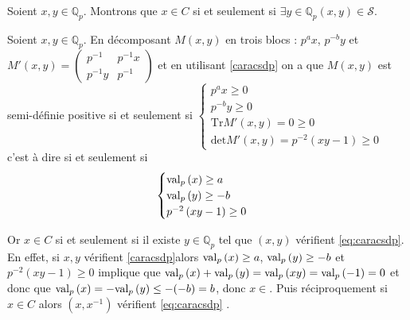 Soient $x,y \in \mathbb{Q}_{p} $. Montrons que $x \in C$ si et seulement si  $\exists y \in \mathbb{Q}_{p} \left( x,y \right) \in \mathcal{S}$.

Soient $x,y \in \mathbb{Q}_{p} $.
En décomposant $M(x,y)$ en trois blocs : $p^ax$, $p^{-b}y $ et $M'(x,y) = \begin{pmatrix} p^{-1} & p^{-1}x \\ p^{-1} y & p^{-1}\end{pmatrix} $ et en utilisant \ref{caracsdp} on a que $M(x,y)$ est semi-définie positive si et seulement si 
$
\begin{cases}
p^ax \ge 0 \\
p^{-b}y \ge 0\\
\text{Tr}M'\left( x,y \right) = 0 \ge 0\\
\text{det} M'(x,y ) = p^{-2}\left( xy-1 \right)  \ge 0 
\end{cases}
$ 
c'est à dire si et seulement si 
\begin{equation}
\label{eq:caracsdp} 
\begin{cases} 
	\text{val}_p\left(x\right)\ge a\\
\text{val}_p\left(y\right)\ge -b\\
p^{-2} \left( xy-1 \right) \ge 0
\end{cases}
\end{equation}



Or $x \in C$ si et seulement si il existe $y \in \mathbb{Q}_{p} $ tel que $(x, y)$ vérifient \ref{eq:caracsdp}. En effet, si $x, y$ vérifient \ref{caracsdp}alors $\text{val}_p\left(x\right)\ge a$, $\text{val}_p\left(y\right)\ge -b$ et $p^{-2} \left( xy-1 \right) \ge 0$ implique que $\text{val}_p\left(x\right)+\text{val}_p\left(y\right)=\text{val}_p\left(xy\right) = \text{val}_p\left(-1\right) =0$ et donc que $\text{val}_p\left(x\right)=-\text{val}_p\left(y\right)\le -(-b)  =b$, donc $x \in $. Puis réciproquement si $x \in C$ alors $(x,x^{-1}) $ vérifient \ref{eq:caracsdp}  .
